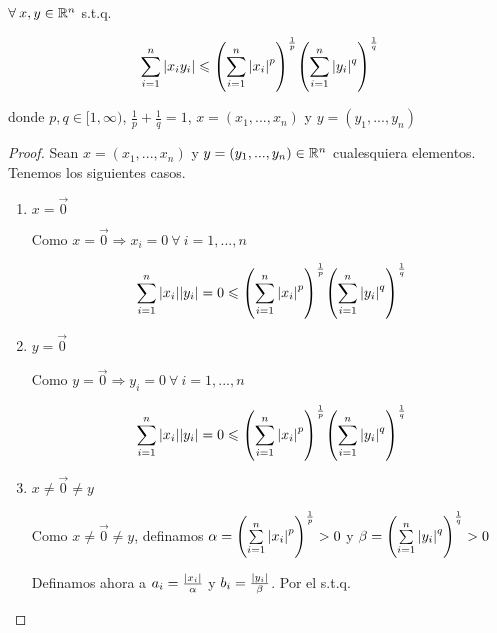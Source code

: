 \begin{lemma} \label{lema2}
    $\forall \: x,y \in \mathbb{R}^n $ s.t.q.

    \begin{equation*}
        \sum_{i=1}^{n} \abs{{x}_{i}{y}_{i}} \leqslant {\left( \sum_{i=1}^{n} {\abs{{x}_{i}}}^{p}\right)}^{\frac{1}{p}} {\left( \sum_{i=1}^{n} {\abs{{y}_{i}}}^{q}\right)}^{\frac{1}{q}}
    \end{equation*}

    donde $p,q \in [1,\infty)$, $\frac{1}{p}+\frac{1}{q} = 1$, $x=(x_1,...,x_n)$ y $y=(y_1,...,y_n)$
\end{lemma}

\begin{proof}
    Sean $x=(x_1,...,x_n)$ y $y=(y_1,...,y_n) \in \mathbb{R}^n$ cualesquiera elementos. Tenemos los siguientes casos.
    \begin{enumerate}
        \item $x= \vec{0}$

        Como $x= \vec{0} \Rightarrow x_i = 0 \: \forall \: i = 1,...,n$

        \begin{equation*}
        \sum_{i=1}^{n} \abs{{x}_{i}} \abs{{y}_{i}} = 0 \leqslant {\left( \sum_{i=1}^{n} {\abs{{x}_{i}}}^{p}\right)}^{\frac{1}{p}} {\left( \sum_{i=1}^{n} {\abs{{y}_{i}}}^{q}\right)}^{\frac{1}{q}}
    \end{equation*}

        \item $y= \vec{0}$
        
        Como $y= \vec{0} \Rightarrow y_i = 0 \: \forall \: i = 1,...,n$

        \begin{equation*}
        \sum_{i=1}^{n} \abs{{x}_{i}} \abs{{y}_{i}} = 0 \leqslant {\left( \sum_{i=1}^{n} {\abs{{x}_{i}}}^{p}\right)}^{\frac{1}{p}} {\left( \sum_{i=1}^{n} {\abs{{y}_{i}}}^{q}\right)}^{\frac{1}{q}}
    \end{equation*}

        \item  $x \neq \vec{0} \neq y$

        Como $x \neq \vec{0} \neq y$, definamos $\alpha = {\left( \sum\limits_{i=1}^{n} {\abs{{x}_{i}}}^{p}\right)}^{\frac{1}{p}} > 0$ y  $\beta = {\left( \sum\limits_{i=1}^{n} {\abs{{y}_{i}}}^{q}\right)}^{\frac{1}{q}} > 0$

        Definamos ahora a $a_i = \frac{\abs{x_i}}{\alpha}$ y $b_i = \frac{\abs{y_i}}{\beta}$. Por el  s.t.q.


\end{enumerate}
\end{proof}
